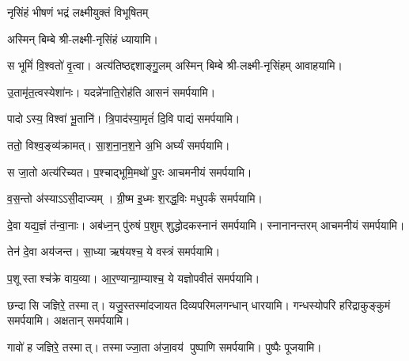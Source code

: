 \begin{center}

{नृसिंहं भीषणं भद्रं लक्ष्मीयुक्तं विभूषितम्}

अस्मिन् बिम्बे श्री-लक्ष्मी-नृसिंहं ध्यायामि।
\medskip

{स भूमिं॑ वि॒श्वतो॑ वृ॒त्वा। अत्य॑तिष्ठद्दशाङ्गु॒लम्}
अस्मिन् बिम्बे श्री-लक्ष्मी-नृसिंहम् आवाहयामि।
\medskip

 {उ॒तामृ॑त॒त्वस्येशा॑नः। यदन्ने॑नाति॒रोह॑ति}
 आसनं समर्पयामि।\medskip

{पादोऽस्य॒ विश्वा॑ भू॒तानि॑। त्रि॒पाद॑स्या॒मृतं॑ दि॒वि}
 पाद्यं समर्पयामि।\medskip
 
{ततो॒ विश्व॒ङ्व्य॑क्रामत्। सा॒श॒ना॒न॒श॒ने अ॒भि}
 अर्घ्यं समर्पयामि।\medskip

{स जा॒तो अत्य॑रिच्यत। प॒श्चाद्भूमि॒मथो॑ पु॒रः}
 आचमनीयं समर्पयामि।\medskip

{व॒स॒न्तो अ॑स्याऽऽसी॒दाज्यम्। ग्री॒ष्म इ॒ध्मः श॒रद्ध॒विः}
मधुपर्कं समर्पयामि।\medskip

 {दे॒वा यद्य॒ज्ञं त॑न्वा॒नाः। अब॑ध्न॒न् पु॑रुषं प॒शुम्}
 शुद्धोदकस्नानं समर्पयामि। स्नानानन्तरम् आचमनीयं समर्पयामि।\medskip

 {तेन॑ दे॒वा अय॑जन्त। सा॒ध्या ऋष॑यश्च॒ ये}
 वस्त्रं समर्पयामि।\medskip

{प॒शूस्ताश्च॑क्रे वाय॒व्या\sn{}। आ॒र॒ण्यान्ग्रा॒म्याश्च॒ ये}
 यज्ञोपवीतं समर्पयामि।\medskip

{छन्दासि जज्ञिरे॒ तस्मात्। यजु॒स्तस्मा॑दजायत}
 दिव्यपरिमलगन्धान् धारयामि। गन्धस्योपरि हरिद्राकुङ्कुमं समर्पयामि। अक्षतान् समर्पयामि।\medskip

{गावो॑ ह जज्ञिरे॒ तस्मात्। तस्माज्जा॒ता अ॑जा॒वय॑}
 पुष्पाणि समर्पयामि।  पुष्पैः पूजयामि।


\end{center}
